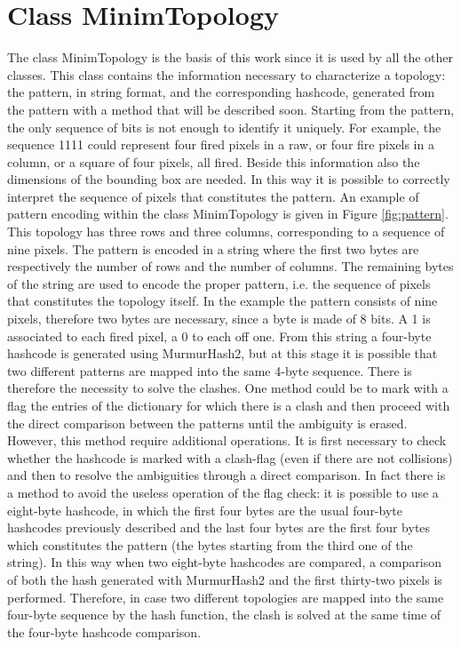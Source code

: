 \section{Class MinimTopology}
The class MinimTopology is the basis of this work since it is used by all the other classes. This class contains the information necessary to characterize a topology: the pattern, in string format, and the corresponding hashcode, generated from the pattern with a method that will be described soon. Starting from the pattern, the only sequence of bits is not enough to identify it uniquely. For example, the sequence 1111 could represent four fired pixels in a raw, or four fire pixels in a column, or a square of four pixels, all fired. Beside this information also the dimensions of the bounding box are needed. In this way it is possible to correctly interpret the sequence of pixels that constitutes the pattern. An example of pattern encoding within the class MinimTopology is given in Figure \ref{fig:pattern}. This topology has three rows and three columns, corresponding to a sequence of nine pixels. The pattern is encoded in a string where the first two bytes are respectively the number of rows and the number of columns. The remaining bytes of the string are used to encode the proper pattern, i.e. the sequence of pixels that constitutes the topology itself. In the example the pattern consists of nine pixels, therefore two bytes are necessary, since a byte is made of 8 bits. A 1 is associated to each fired pixel, a 0 to each off one. From this string a four-byte hashcode is generated using MurmurHash2, but at this stage it is possible that two different patterns are mapped into the same 4-byte sequence. There is therefore the necessity to solve the clashes. One method could be to mark with a flag the entries of the dictionary for which there is a clash and then proceed with the direct comparison between the patterns until the ambiguity is erased. However, this method require additional operations. It is first necessary to check whether the hashcode is marked with a clash-flag (even if there are not collisions) and then to resolve the ambiguities through a direct comparison. In fact there is a method to avoid the useless operation of the flag check: it is possible to use a eight-byte hashcode, in which the first four bytes are the usual four-byte hashcodes previously described and the last four bytes are the first four bytes which constitutes the pattern (the bytes starting from the third one of the string). In this way when two eight-byte hashcodes are compared, a comparison of both the hash generated with MurmurHash2 and the first thirty-two pixels is performed. Therefore, in case two different topologies are mapped into the same four-byte sequence by the hash function, the clash is solved at the same time of the four-byte hashcode comparison.
